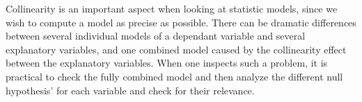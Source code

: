 \documentclass{article}
\begin{document}
Collinearity is an important aspect when looking at statistic models, since we wish to compute a model as precise as possible. There can be dramatic differences between several individual models of a dependant variable and several explanatory variables, and one combined model caused by the collinearity effect between the explanatory variables. When one inspects such a problem, it is practical to check the fully combined model
and then analyze the different null hypothesis' for each variable and check for their relevance. 
\end{document}

